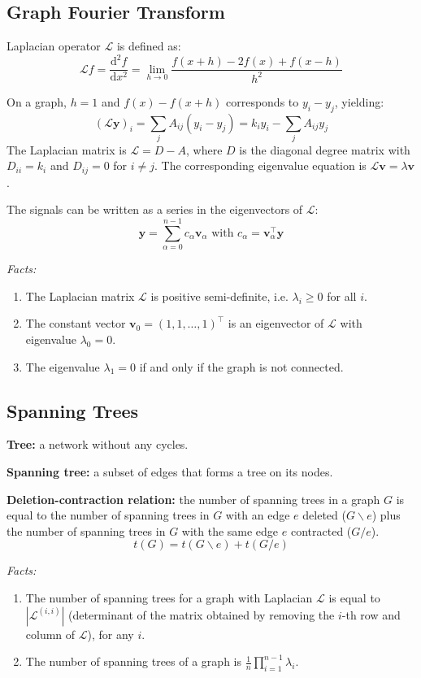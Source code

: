 \documentclass[12pt]{article}
\begin{document}
\subsection{Graph Fourier Transform}
Laplacian operator $\mathcal{L}$ is defined as:
$$
\mathcal{L} f = \frac{\mathrm{d}^2 f}{\mathrm{d} x^2} = \lim_{h \to 0} \frac{f(x + h) - 2f(x) + f(x - h)}{h^2}
$$

On a graph, $h = 1$ and $f(x) - f(x + h)$ corresponds to $y_i - y_j$, yielding:
$$
(\mathcal{L} \boldsymbol{y})_i = \sum_j A_{ij} (y_i - y_j) = k_i y_i - \sum_j A_{ij} y_j
$$
The Laplacian matrix is $\mathcal{L} = D - A$, where $D$ is the diagonal degree matrix with $D_{ii} = k_i$ and $D_{ij} = 0$ for $i \neq j$.
The corresponding eigenvalue equation is $\mathcal{L} \boldsymbol{v} = \lambda \boldsymbol{v}$.

The signals can be written as a series in the eigenvectors of $\mathcal{L}$:
$$\boldsymbol{y} = \sum_{\alpha=0}^{n-1} c_\alpha \boldsymbol{v}_\alpha \text{ with } c_\alpha = \boldsymbol{v}_\alpha^\top \boldsymbol{y}$$

\textit{Facts:}
\begin{enumerate}
    \item The Laplacian matrix $\mathcal{L}$ is positive semi-definite, i.e. $\lambda_i \geq 0$ for all $i$.
    \item The constant vector $\boldsymbol{v}_0 = (1, 1, \ldots, 1)^\top$ is an eigenvector of $\mathcal{L}$ with eigenvalue $\lambda_0 = 0$.
    \item The eigenvalue $\lambda_1 = 0$ if and only if the graph is not connected.
\end{enumerate}

\subsection{Spanning Trees}
\textbf{Tree:} a network without any cycles.

\textbf{Spanning tree:} a subset of edges that forms a tree on its nodes.

\textbf{Deletion-contraction relation:} the number of spanning trees in a graph $G$ is equal to the number of spanning trees in $G$ with an edge $e$ deleted ($G \backslash e$) plus the number of spanning trees in $G$ with the same edge $e$ contracted ($G / e$).
$$
t(G) = t(G \backslash e) + t(G / e)
$$

\textit{Facts:}
\begin{enumerate}
    \item The number of spanning trees for a graph with Laplacian $\mathcal{L}$ is equal to $|\mathcal{L}^{(i,i)}|$ (determinant of the matrix obtained by removing the $i$-th row and column of $\mathcal{L}$), for any $i$.
    \item The number of spanning trees of a graph is $\frac{1}{n} \prod_{i=1}^{n-1} \lambda_i$.
\end{enumerate}
\end{document}
